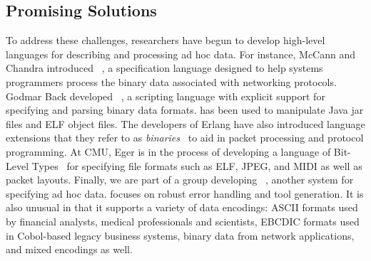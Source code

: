 \subsection{Promising Solutions}

To address these challenges, 
researchers have begun to develop high-level languages 
for describing and processing ad hoc data.  For instance,
McCann and Chandra introduced
\packettypes{}~\cite{sigcomm00}, a specification language designed to help 
systems programmers process the binary data associated
with networking protocols.  Godmar Back developed
\datascript{}~\cite{gpce02}, a scripting language with explicit
support for specifying and parsing binary data formats. \datascript{}
has been used to manipulate Java jar files and ELF object files.  The
developers of Erlang have also introduced language extensions that
they refer to as {\em binaries}~\cite{erlang-bits} to aid in packet
processing and protocol programming.  At CMU, Eger is in the process
of developing a
language of Bit-Level Types~\cite{eger:blt} for specifying file
formats such as ELF, JPEG, and MIDI as well as packet layouts.
Finally, we are part of a group developing
\pads{}~\cite{fisher+:pads}, another system for specifying ad hoc data.
\pads{} focuses on robust error handling and tool generation.
It is also unusual in that it supports a variety of data encodings:
ASCII formats used by financial analysts, medical professionals and scientists,
EBCDIC formats used in Cobol-based legacy business systems,
binary data from network applications, and mixed encodings as well.



